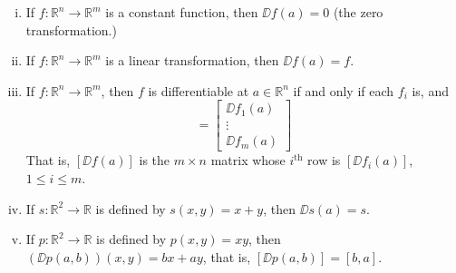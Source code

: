 \documentclass[11pt]{article}
\begin{document}
\begin{thm}
  \label{thm:diffrule}
  \begin{enumerate}[(i)]
  \item If $f : \mathbb{R}^n \rightarrow \mathbb{R}^m$ is a constant function, then $\DD f(a) = 0$ (the zero transformation.)
    
  \item If $f : \mathbb{R}^n \rightarrow \mathbb{R}^m$ is a linear transformation, then $\DD f(a) = f$.

  \item If $f : \mathbb{R}^n \rightarrow \mathbb{R}^m$, then $f$ is differentiable at $a \in \mathbb{R}^n$ if and only if each $f_i$ is, and
    \begin{equation*}
      [\DD f(a)] =
      \begin{bmatrix}
	\DD f_1(a) \\ \vdots \\ \DD f_m(a)
      \end{bmatrix}
    \end{equation*}
    That is,  $[\DD f(a)]$ is the $m \times n$ matrix whose $i^{\text{th}}$ row is $[\DD f_i(a)]$, $1 \leqslant i \leqslant m$.

  \item If $s : \mathbb{R}^2 \rightarrow \mathbb{R}$ is defined by $s(x,y) = x+y$, then $\DD s(a) = s$.

  \item If $p : \mathbb{R}^2 \rightarrow \mathbb{R}$ is defined by $p(x,y) = xy$, then $(\DD p(a,b))(x,y) = bx + ay$, that is,  $[\DD p(a,b)] = [b,a]$.
  \end{enumerate}
\end{thm}
\end{document}
